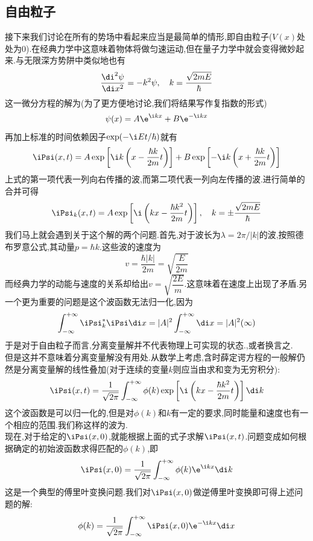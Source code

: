 \documentclass{ctexart}
\begin{document}
\subsection{自由粒子}
接下来我们讨论在所有的势场中看起来应当是最简单的情形,即自由粒子($V(x)$处处为$0$).在经典力学中这意味着物体将做匀速运动,但在量子力学中就会变得微妙起来.与无限深方势阱中类似地也有
\[\dfrac{\di^2\psi}{\di x^2}=-k^2\psi,\quad k=\dfrac{\sqrt{2mE}}{\hbar}\]
这一微分方程的解为(为了更方便地讨论,我们将结果写作复指数的形式)
\[\psi(x)=A\e^{\i kx}+B\e^{-\i kx}\]
再加上标准的时间依赖因子$\exp(-\i Et/\hbar)$就有
\[\iPsi(x,t)=A\exp\left[\i k\left(x-\dfrac{\hbar k}{2m}t\right)\right]+B\exp\left[-\i k\left(x+\dfrac{\hbar k}{2m}t\right)\right]\]
上式的第一项代表一列向右传播的波,而第二项代表一列向左传播的波.进行简单的合并可得
\[\iPsi_k(x,t)=A\exp\left[\i\left(kx-\dfrac{\hbar k^2}{2m}t\right)\right],\quad k=\pm\dfrac{\sqrt{2mE}}{\hbar}\]
\indent 我们马上就会遇到关于这个解的两个问题.首先,对于波长为$\lambda=2\pi/|k|$的波,按照德布罗意公式,其动量$p=\hbar k$.这些波的速度为
\[v=\dfrac{\hbar|k|}{2m}=\sqrt{\dfrac{E}{2m}}\]
而经典力学的动能与速度的关系却给出$v=\sqrt{\dfrac{2E}{m}}$.这意味着在速度上出现了矛盾.另一个更为重要的问题是这个波函数无法归一化,因为
\[\int_{-\infty}^{+\infty}\iPsi_k^\ast\iPsi\di x=|A|^2\int_{-\infty}^{+\infty}\di x=|A|^2(\infty)\]
于是对于自由粒子而言,分离变量解并不代表物理上可实现的状态.,或者换言之.\\
\indent 但是这并不意味着分离变量解没有用处.从数学上考虑,含时薛定谔方程的一般解仍然是分离变量解的线性叠加(对于连续的变量$k$则应当由求和变为无穷积分):
\[\iPsi(x,t)=\dfrac{1}{\sqrt{2\pi}}\int_{-\infty}^{+\infty}\phi(k)\exp\left[\i\left(kx-\dfrac{\hbar k^2}{2m}t\right)\right]\di k\]
这个波函数是可以归一化的,但是对$\phi(k)$和$k$有一定的要求,同时能量和速度也有一个相应的范围.我们称这样的波为.\\
\indent 现在,对于给定的$\iPsi(x,0)$,就能根据上面的式子求解$\iPsi(x,t)$.问题变成如何根据确定的初始波函数求得匹配的$\phi(k)$,即
\[\iPsi(x,0)=\dfrac{1}{\sqrt{2\pi}}\int_{-\infty}^{+\infty}\phi(k)\e^{\i kx}\di k\]
这是一个典型的傅里叶变换问题.我们对$\iPsi(x,0)$做逆傅里叶变换即可得上述问题的解:
\[\phi(k)=\dfrac{1}{\sqrt{2\pi}}\int_{-\infty}^{+\infty}\iPsi(x,0)\e^{-\i kx}\di x\]
\end{document}
